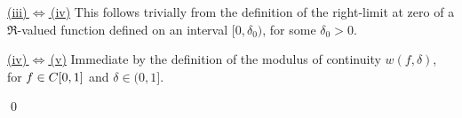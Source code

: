 \vskip 0.5cm
\noindent
\underline{(iii)\,$\Longleftrightarrow$\,(iv)}
\vskip 0.1cm
\noindent
This follows trivially from the definition of the right-limit at zero of a $\Re$-valued function defined
on an interval $[0,\delta_{0})$, for some $\delta_{0} > 0$.

\vskip 0.5cm
\noindent
\underline{(iv)\,$\Longleftrightarrow$\,(v)}
\vskip 0.1cm
\noindent
Immediate by the definition of the modulus of continuity $w(f,\delta)$, for $f \in C[0,1]$ and $\delta \in (0,1]$.

\qed
